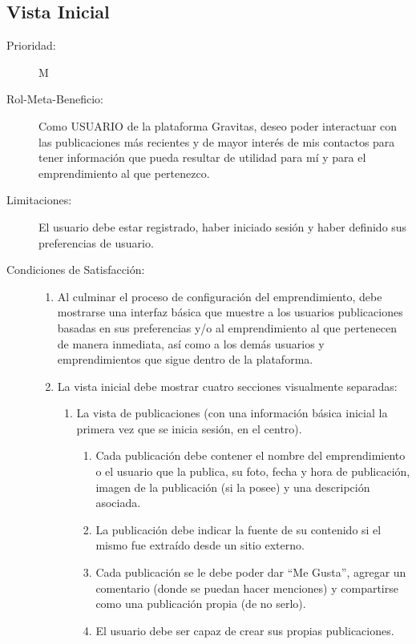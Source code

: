 \newpage

\subsection{Vista Inicial}

\begin{description}
    \item[Prioridad:] M
    \item[Rol-Meta-Beneficio:] Como USUARIO de la plataforma Gravitas, deseo poder interactuar con las publicaciones más recientes y de mayor interés de mis contactos para tener información que pueda resultar de utilidad para mí y para el emprendimiento al que pertenezco.
    \item[Limitaciones:] El usuario debe estar registrado, haber iniciado sesión y haber definido sus preferencias de usuario.
    \item[Condiciones de Satisfacción:] \hfill
        \begin{enumerate}
            \item Al culminar el proceso de configuración del emprendimiento, debe mostrarse una interfaz básica que muestre a los usuarios publicaciones basadas en sus preferencias y/o al emprendimiento al que pertenecen de manera inmediata, así como a los demás usuarios y emprendimientos que sigue dentro de la plataforma.
            \item La vista inicial debe mostrar cuatro secciones visualmente separadas:
                \begin{enumerate}
                    \item La vista de publicaciones (con una información básica inicial la primera vez que se inicia sesión, en el centro).
                    \begin{enumerate}
                        \item Cada publicación debe contener el nombre del emprendimiento o el usuario que la publica, su foto, fecha y hora de publicación, imagen de la publicación (si la posee) y una descripción asociada.
                        \item La publicación debe indicar la fuente de su contenido si el mismo fue extraído desde un sitio externo.
                        \item Cada publicación se le debe poder dar “Me Gusta”,  agregar un comentario (donde se puedan hacer menciones) y compartirse como una publicación propia (de no serlo).
                        \item El usuario debe ser capaz de crear sus propias publicaciones.

\end{enumerate}
\end{enumerate}
\end{enumerate}
\end{description}

